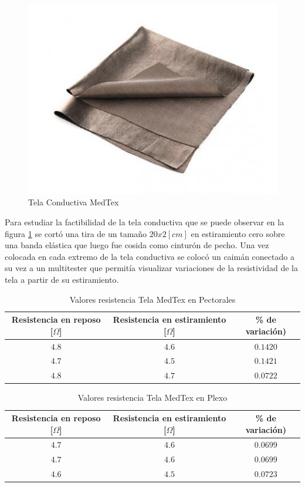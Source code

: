 \begin{figure}[H]
\centering
\includegraphics[scale=0.5]{figuras/tela/medtex.jpg}
\caption{Tela Conductiva MedTex}
\label{medtex}
\end{figure}

Para estudiar la factibilidad de la tela conductiva que se puede observar en la figura \ref{medtex} se cortó una tira de un tamaño $20x2 [cm]$ en estiramiento cero sobre una banda elástica que luego fue cosida como cinturón de pecho. Una vez colocada en cada extremo de la tela conductiva se colocó un caimán conectado a su vez a un multitester que permitía visualizar variaciones de la resistividad de la tela a partir de su estiramiento. 

\newpage
\begin{table}[H]
\centering
\begin{tabular}{| c | c | c |}
\hline
\multicolumn{1}{|c|}{\textbf{Resistencia en reposo [$\Omega$]}}&
\multicolumn{1}{c|}{\textbf{Resistencia en estiramiento [$\Omega$]}}&
\multicolumn{1}{|c|}{\textbf{\% de variación)}}\\ \hline
$4.8$  & $4.6$  & $0.1420$  \\ \hline
$4.7$  & $4.5$ & $0.1421$ \\ \hline
$4.8$ & $4.7$  & $0.0722$  \\ \hline
\end{tabular}
\caption{Valores resistencia Tela MedTex en Pectorales}
\label{tablatex1}
\end{table}

\begin{table}[H]
\centering
\begin{tabular}{| c | c | c |}
\hline
\multicolumn{1}{|c|}{\textbf{Resistencia en reposo [$\Omega$]}}&
\multicolumn{1}{c|}{\textbf{Resistencia en estiramiento [$\Omega$]}}&
\multicolumn{1}{|c|}{\textbf{\% de variación)}}\\ \hline
$4.7$  & $4.6$  & $0.0699$  \\ \hline
$4.7$  & $4.6$ & $0.0699$ \\ \hline
$4.6$ & $4.5$  & $0.0723$  \\ \hline
\end{tabular}
\caption{Valores resistencia Tela MedTex en Plexo}
\label{tablatex2}
\end{table}

